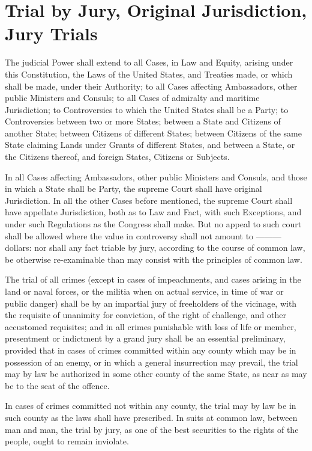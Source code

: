 \documentclass{constitution}
\begin{document}
\section{Trial by Jury, Original Jurisdiction, Jury Trials}
The judicial Power shall extend
to all Cases, in Law and Equity, arising under this Constitution,
	the Laws of the United States,
and	Treaties made, or which shall be made, under their Authority;
to all Cases affecting Ambassadors, other public Ministers and Consuls;
to all Cases of admiralty and maritime Jurisdiction;
to Controversies to which the United States shall be a Party;
to Controversies between two or more States;
between a State and Citizens of another State;
between Citizens of different States;
between Citizens of the same State claiming Lands under Grants of different States,
and between a State, or the Citizens thereof, and foreign States, Citizens or Subjects.

In all Cases affecting Ambassadors, other public Ministers and Consuls,
and those in which a State shall be Party,
the supreme Court shall have original Jurisdiction.
In all the other Cases before mentioned,
the supreme Court shall have appellate Jurisdiction, both as to Law and Fact,
with such Exceptions, and under such Regulations as the Congress shall make.
But no appeal to such court shall be allowed
where the value in controversy shall not amount to ——— dollars:
nor shall any fact triable by jury,
according to the course of common law,
be otherwise re-examinable
than may consist with the principles of common law.

The trial of all crimes
(except in cases of impeachments,
and cases arising in the land or naval forces,
	or the militia when on actual service,
in time of war or public danger)
shall be by an impartial jury of freeholders of the vicinage,
with the requisite of unanimity for conviction,
of the right of challenge,
and other accustomed requisites;
and in all crimes punishable with loss of life or member,
presentment or indictment by a grand jury shall be an essential preliminary,
provided that in cases of crimes committed within any county
which may be in possession of an enemy,
or in which a general insurrection may prevail,
the trial may by law be authorized in some other county
of the same State,
as near as may be to the seat of the offence.

In cases of crimes committed not within any county,
the trial may by law be in such county as the laws shall have prescribed.
In suits at common law, between man and man,
the trial by jury,
as one of the best securities to the rights of the people,
ought to remain inviolate.
\end{document}
